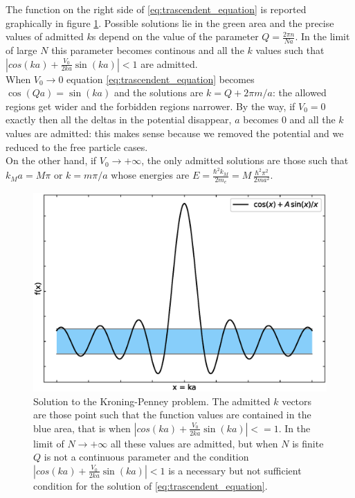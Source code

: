 \documentclass{article}
\begin{document}
The function on the right side of \ref{eq:trascendent_equation} is reported graphically in figure \ref{fig:trascendent_equation}. Possible solutions lie in the green area and the precise values of admitted $k$s
depend on the value of the parameter $Q = \frac{2\pi n}{Na}$. In the limit of large $N$ this parameter becomes continous and all the $k$ values such that $|cos(ka) + \frac{V_0}{2ka} \sin(ka)| < 1$ are admitted. \\
When $V_0 \to 0$ equation \ref{eq:trascendent_equation} becomes $\cos(Qa) = \sin(ka)$ and the solutions are $k = Q + 2\pi m/a$: the allowed regions get wider and the forbidden regions narrower. By the way, if $V_0=0$ exactly then all the deltas in the potential 
disappear, $a$ becomes $0$ and all the $k$ values are admitted: this makes sense because we removed the potential and we reduced to the free particle cases. \\
On the other hand, if $V_0 \to +\infty$, the only admitted solutions are those such that $k_Ma = M\pi$ or $k = m\pi/a$ whose energies are $E = \frac{\hbar^2 k_M}{2m_e} = M \, \frac{\hbar^2\pi^2}{2m a^2}$.
\begin{figure}[hbp]
    \centering
    \includegraphics[scale=0.5]{scripts/trascendent.eps}
    \caption{Solution to the Kroning-Penney problem. The admitted $k$ vectors are those point such that the function values are contained in the blue area, that is when $|cos(ka) + \frac{V_0}{2ka} \sin(ka)| <= 1$. In the limit of 
    $N \to +\infty$ all these values are admitted, but when $N$ is finite $Q$ is not a continuous parameter and the condition $|cos(ka) + \frac{V_0}{2ka} \sin(ka)| < 1$ is a necessary but not sufficient condition for the solution of \ref{eq:trascendent_equation}.}
    \label{fig:trascendent_equation}
\end{figure}
\end{document}
